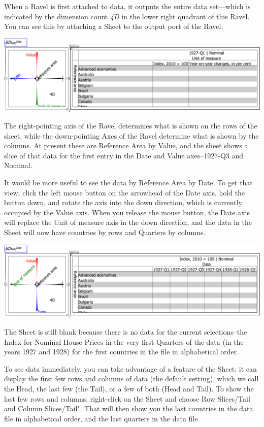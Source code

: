 When a Ravel is first attached to data, it outputs the entire data
set---which is indicated by the dimension count \emph{4D} in the
lower right quadrant of this Ravel. You can see this by attaching
a Sheet to the output port of the Ravel:

\includegraphics[width=15cm]{images/tut01Ravel4DwithSheet}

The right-pointing axis of the Ravel determines what is shown on the
rows of the sheet, while the down-pointing Axes of the Ravel determine
what is shown by the columns. At present these are Reference Area
by Value, and the sheet shows a slice of that data for the first entry
in the Date and Value axes--1927-Q3 and Nominal.

It would be more useful to see the data by Reference Area by Date.
To get that view, click the left mouse button on the arrowhead of
the Date axis, hold the button down, and rotate the axis into the
down direction, which is currently occupied by the Value axis. When
you release the mouse button, the Date axis will replace the Unit
of measure axis in the down direction, and the data in the Sheet will
now have countries by rows and Quarters by columns.

\includegraphics[width=15cm]{images/tut02HPI4DwithSheetRotatedCountryDate}

The Sheet is still blank because there is no data for the current
selections--the Index for Nominal House Prices in the very first
Quarters of the data (in the years 1927 and 1928) for the first countries
in the file in alphabetical order.

To see data immediately, you can take advantage of a feature of the
Sheet: it can display the first few rows and columns of data (the
default setting), which we call the Head, the last few (the Tail),
or a few of both (Head and Tail). To show the last few rows and columns,
right-click on the Sheet and choose Row Slices/Tail and Column Slices/Tail".
That will then show you the last countries in the data file in alphabetical
order, and the last quarters in the data file.

